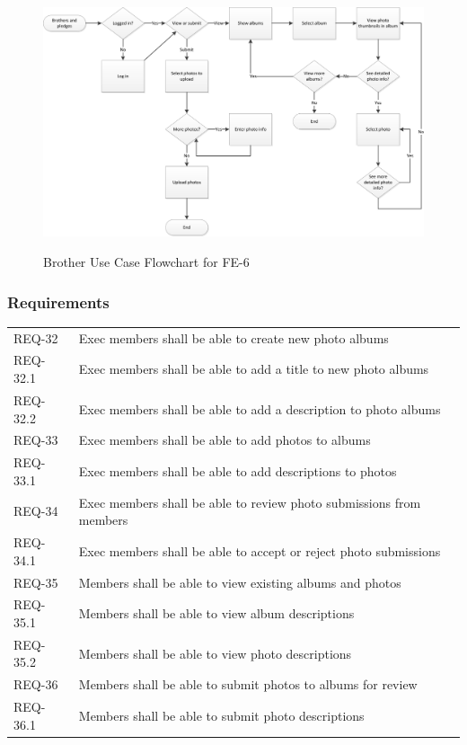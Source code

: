 \documentclass{article}
\newcommand{\req}[1]{REQ-{#1}}
\begin{document}
\FloatBarrier
\begin{figure}
\centering
\caption{Brother Use Case Flowchart for FE-6}
\includegraphics[scale=.75]{img/brotherUseCaseFE6.png}
\label{fig:brotherUseCaseFE6}
\end{figure}
\FloatBarrier

\newpage

\subsubsection{Requirements}

\begin{tabular}{lp{8cm}}
\req{32} & Exec members shall be able to create new photo albums \\
\req{32.1} & Exec members shall be able to add a title to new photo
albums\\
\req{32.2} & Exec members shall be able to add a description to photo albums\\
\req{33} & Exec members shall be able to add photos to albums \\
\req{33.1} & Exec members shall be able to add descriptions to photos\\
\req{34} & Exec members shall be able to review photo submissions from
members \\
\req{34.1} & Exec members shall be able to accept or reject photo submissions\\
\req{35} & Members shall be able to view existing albums and photos \\
\req{35.1} & Members shall be able to view album descriptions\\
\req{35.2} & Members shall be able to view photo descriptions\\
\req{36} & Members shall be able to submit photos to albums for review
\\
\req{36.1} & Members shall be able to submit photo descriptions\\
\end{tabular}
\end{document}
